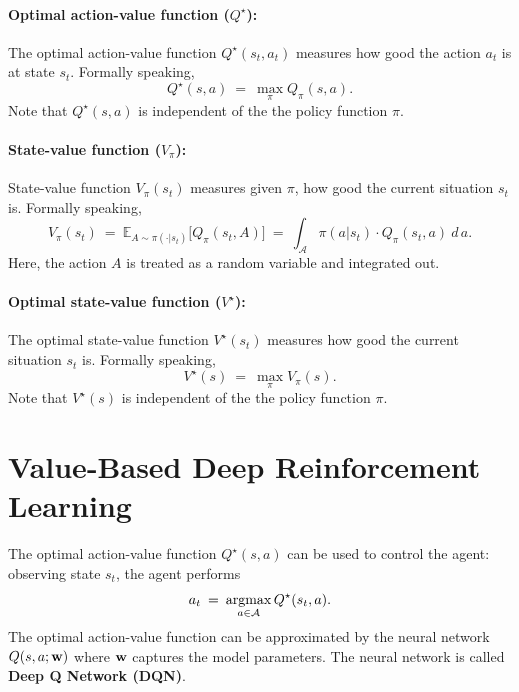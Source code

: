 \documentclass[11pt]{article}
\numberwithin{equation}{section}
\def\w{{\bf w}}
\def\AM{{\mathcal A}}
\def\EB{{\mathbb E}}
\def\argmax{\mathop{\rm argmax}}
\def\argmax{\mathop{\rm argmax}}
\begin{document}
\paragraph{Optimal action-value function ($Q^\star $):}
The optimal action-value function $Q^\star (s_t, a_t)$ measures how good the action $a_t$ is at state $s_t$.
Formally speaking, 
\begin{equation*}
    Q^\star (s, a)
    \: = \: \max_{\pi } Q_{\pi} (s, a).
\end{equation*}
Note that $Q^\star (s, a)$ is independent of the the policy function $\pi$.



\paragraph{State-value function ($V_{\pi} $):}
State-value function $V_{\pi} (s_t)$ measures given $\pi$, how good the current situation $s_t$ is.
Formally speaking, 
\begin{equation*}
    V_{\pi} (s_t )
    \: = \: \EB_{A\sim \pi (\cdot | s_t )} \big[ Q_{\pi} (s_t, A)  \big] 
    \: = \: \int_{\AM } \pi (a | s_t ) \cdot Q_{\pi} (s_t, a) \: d \, a .
\end{equation*}
Here, the action $A$ is treated as a random variable and integrated out.




\paragraph{Optimal state-value function ($V^\star $):}
The optimal state-value function $V^\star (s_t)$ measures how good the current situation $s_t$ is.
Formally speaking, 
\begin{equation*}
    V^\star (s )
    \: = \: \max_{\pi } V_{\pi} (s).
\end{equation*}
Note that $V^\star (s)$ is independent of the the policy function $\pi$.



\section{Value-Based Deep Reinforcement Learning}


The optimal action-value function $Q^\star  (s, a)$ can be used to control the agent: observing state $s_t$, the agent performs 
\begin{equation*}
    a_t  \: = \:  \argmax_{a \in \AM } Q^\star (s_t , a ) .
\end{equation*}
The optimal action-value function can be approximated by the neural network $Q (s, a; \w )$ where $\w$ captures the model parameters.
The neural network is called \textbf{Deep Q Network (DQN)}.
\end{document}
